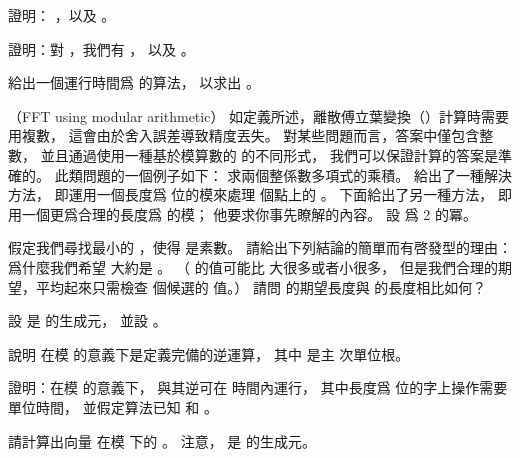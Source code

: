 \startANSWER
{}
\stopANSWER

\startigBase[continue]\startitem
證明： ，以及 。
\stopitem\stopigBase

\startANSWER
{}
\stopANSWER

\startigBase[continue]\startitem
證明：對 ，我們有 ，
以及 。
\stopitem\stopigBase

\startANSWER
{}
\stopANSWER

\startigBase[continue]\startitem
給出一個運行時間爲  的算法，
以求出 。
\stopitem\stopigBase

\startANSWER
{}
\stopANSWER
\stopPROBLEM

\startPROBLEM
（FFT using modular arithmetic）
如定義所述，離散傅立葉變換（）計算時需要用複數，
這會由於舍入誤差導致精度丟失。
對某些問題而言，答案中僅包含整數，
並且通過使用一種基於模算數的  的不同形式，
我們可以保證計算的答案是準確的。
此類問題的一個例子如下：
求兩個整係數多項式的乘積。
\inexercise[30.2-6] 給出了一種解決方法，
即運用一個長度爲  位的模來處理  個點上的 。
下面給出了另一種方法，
即用一個更爲合理的長度爲  的模；
他要求你事先瞭解的內容。
設  爲 2 的冪。

\startigBase[a]\startitem
假定我們尋找最小的 ，使得  是素數。
請給出下列結論的簡單而有啓發型的理由：
爲什麼我們希望  大約是 。
（ 的值可能比  大很多或者小很多，
但是我們合理的期望，平均起來只需檢查  個候選的  值。）
請問  的期望長度與  的長度相比如何？
\stopitem\stopigBase

\startANSWER
{}
\stopANSWER

設  是  的生成元，
並設 。

\startigBase[continue]\startitem
說明  在模  的意義下是定義完備的逆運算，
其中 \m{\omega} 是主  次單位根。
\stopitem\stopigBase

\startANSWER
{}
\stopANSWER

\startigBase[continue]\startitem
證明：在模  的意義下，  與其逆可在  時間內運行，
其中長度爲  位的字上操作需要單位時間，
並假定算法已知  和 \m{\omega}。
\stopitem\stopigBase

\startANSWER
{}
\stopANSWER

\startigBase[continue]\startitem
請計算出向量  在模  下的 。
注意，  是  的生成元。
\stopitem\stopigBase

\startANSWER
{}
\stopANSWER
\stopPROBLEM

\stopsubject%
